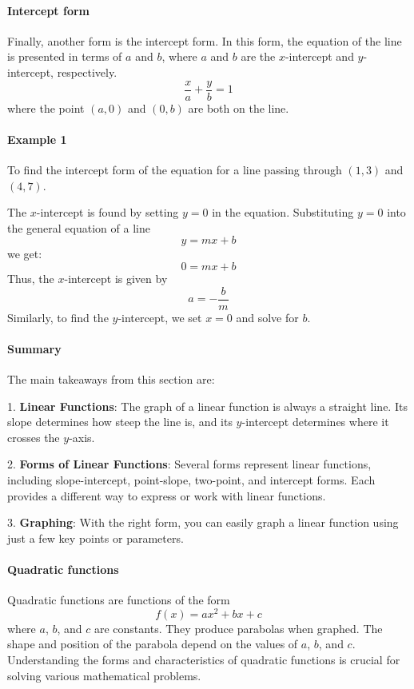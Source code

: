 \paragraph{Intercept form}

Finally, another form is the intercept form. In this form, the equation of the line is presented in terms of $a$ and $b$, where $a$ and $b$ are the $x$-intercept and $y$-intercept, respectively.
$$
\frac{x}{a} + \frac{y}{b} = 1
$$
where the point $(a, 0)$ and $(0, b)$ are both on the line.

\paragraph{Example 1}

To find the intercept form of the equation for a line passing through $(1, 3)$ and $(4, 7)$.

The $x$-intercept is found by setting $y = 0$ in the equation. Substituting $y = 0$ into the general equation of a line
$$
y = m x + b
$$
we get:
$$
0 = m x + b
$$
Thus, the $x$-intercept is given by
$$
a = - \frac{b}{m}
$$
Similarly, to find the $y$-intercept, we set $x = 0$ and solve for $b$.

\paragraph{Summary}

The main takeaways from this section are:

1. \textbf{Linear Functions}: The graph of a linear function is always a straight line. Its slope determines how steep the line is, and its $y$-intercept determines where it crosses the $y$-axis.

2. \textbf{Forms of Linear Functions}: Several forms represent linear functions, including slope-intercept, point-slope, two-point, and intercept forms. Each provides a different way to express or work with linear functions.

3. \textbf{Graphing}: With the right form, you can easily graph a linear function using just a few key points or parameters.

\paragraph{Quadratic functions}

Quadratic functions are functions of the form
$$
f(x) = ax^2 + bx + c
$$
where $a$, $b$, and $c$ are constants. They produce parabolas when graphed. The shape and position of the parabola depend on the values of $a$, $b$, and $c$. Understanding the forms and characteristics of quadratic functions is crucial for solving various mathematical problems.

